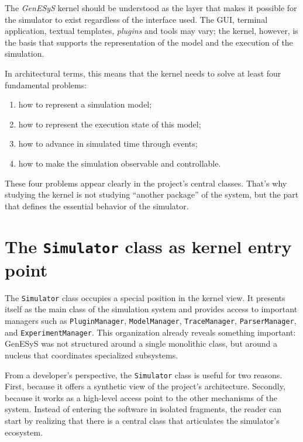 The \textit{GenESyS} kernel should be understood as the layer that makes it possible for the simulator to exist regardless of the interface used. The GUI, terminal application, textual templates, \textit{plugins} and tools may vary; the kernel, however, is the basis that supports the representation of the model and the execution of the simulation.

In architectural terms, this means that the kernel needs to solve at least four fundamental problems:

\begin{enumerate}
 \item how to represent a simulation model;
 \item how to represent the execution state of this model;
 \item how to advance in simulated time through events;
 \item how to make the simulation observable and controllable.
\end{enumerate}

These four problems appear clearly in the project's central classes. That's why studying the kernel is not studying ``another package'' of the system, but the part that defines the essential behavior of the simulator.

\section{The \texttt{Simulator} class as kernel entry point}
\label{sec:cap7_classe_simulator}

The \texttt{Simulator} class occupies a special position in the kernel view. It presents itself as the main class of the simulation system and provides access to important managers such as \texttt{PluginManager}, \texttt{ModelManager}, \texttt{TraceManager}, \texttt{ParserManager}, and \texttt{ExperimentManager}. This organization already reveals something important: GenESyS was not structured around a single monolithic class, but around a nucleus that coordinates specialized subsystems.

From a developer's perspective, the \texttt{Simulator} class is useful for two reasons. First, because it offers a synthetic view of the project's architecture. Secondly, because it works as a high-level access point to the other mechanisms of the system. Instead of entering the software in isolated fragments, the reader can start by realizing that there is a central class that articulates the simulator's ecosystem.

